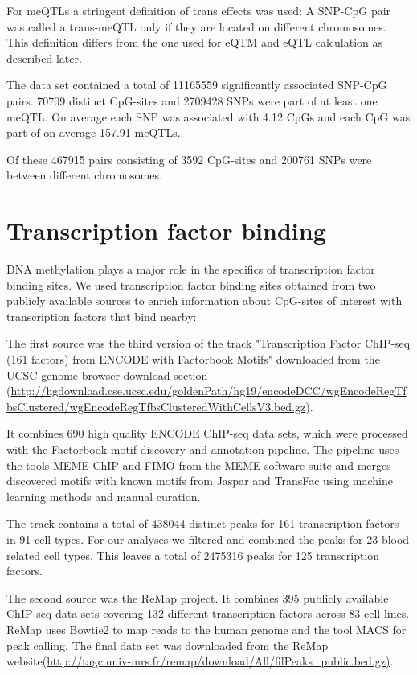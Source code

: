 \documentclass[a4paper,12pt,twoside,openright]{report}
\begin{document}
For meQTLs a stringent definition of trans effects was used: A SNP-CpG pair was called a trans-meQTL only if they are located on different chromosomes. This definition differs from the one used for eQTM and eQTL calculation as described later. 

The data set contained a total of 11165559 significantly associated SNP-CpG pairs. 
70709 distinct CpG-sites and 2709428 SNPs were part of at least one meQTL. On average each SNP was associated with 4.12 CpGs and each CpG was part of on average 157.91 meQTLs.

Of these 467915 pairs consisting of 3592 CpG-sites and 200761 SNPs were between different chromosomes. 


\section{Transcription factor binding}
\label{Data:tfbs}
DNA methylation plays a major role in the specifics of transcription factor binding sites\cite{Yineaaj2239}. We used transcription factor binding sites obtained from two publicly available sources to enrich information about CpG-sites of interest with transcription factors that bind nearby: 

The first source was the third version of the track "Transcription Factor ChIP-seq (161 factors) from ENCODE with Factorbook Motifs"\cite{10.1101/gr.139105.112} downloaded from the UCSC genome browser download section (\url{http://hgdownload.cse.ucsc.edu/goldenPath/hg19/encodeDCC/wgEncodeRegTfbsClustered/wgEncodeRegTfbsClusteredWithCellsV3.bed.gz}).

It combines 690 high quality ENCODE ChIP-seq data sets, which were processed with the Factorbook motif discovery and annotation pipeline\cite{10.1101/gr.139105.112}. The pipeline uses the tools MEME-ChIP\cite{10.1093/bioinformatics/btr189} and FIMO\cite{10.1093/bioinformatics/btr064} from the MEME software suite and merges discovered motifs with known motifs from Jaspar\cite{10.1093/nar/gkx1126} and TransFac\cite{10.1093/nar/gkj143} using machine learning methods and manual curation. 

The track contains a total of 438044 distinct peaks for 161 transcription factors in 91 cell types. For our analyses we filtered and combined the peaks for 23 blood related cell types. This leaves a total of 2475316 peaks for 125 transcription factors.  

The second source was the ReMap project\cite{10.1093/nar/gku1280}. It combines 395 publicly available ChIP-seq data sets covering 132 different transcription factors across 83 cell lines. ReMap uses Bowtie2\cite{10.1038/nmeth.1923} to map reads to the human genome and the tool MACS\cite{10.1186/gb-2008-9-9-r137} for peak calling. The final data set was downloaded from the ReMap website\url{(http://tagc.univ-mrs.fr/remap/download/All/filPeaks_public.bed.gz)}.
\end{document}

